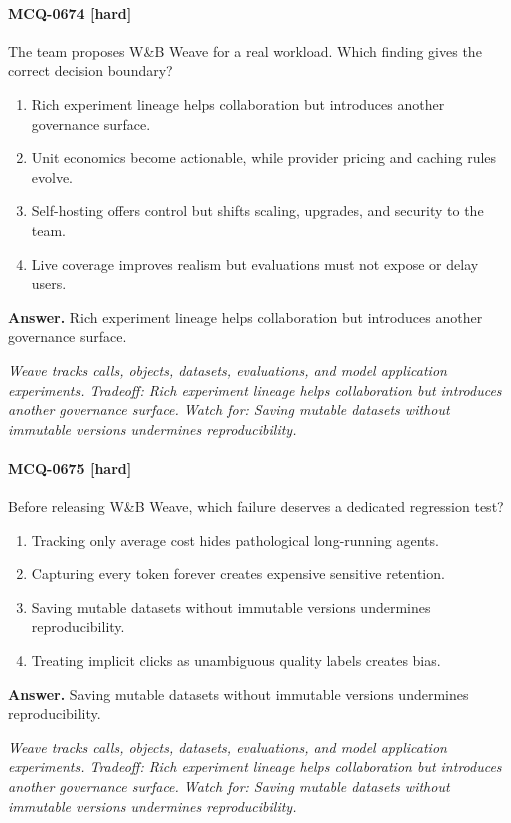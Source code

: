 \paragraph{MCQ-0674 [hard]} The team proposes W\&B Weave for a real workload. Which finding gives the correct decision boundary?
\begin{enumerate}[label=\Alph*.]
\item Rich experiment lineage helps collaboration but introduces another governance surface.
\item Unit economics become actionable, while provider pricing and caching rules evolve.
\item Self-hosting offers control but shifts scaling, upgrades, and security to the team.
\item Live coverage improves realism but evaluations must not expose or delay users.
\end{enumerate}
\noindent\textbf{Answer.} Rich experiment lineage helps collaboration but introduces another governance surface.
\par\textit{Weave tracks calls, objects, datasets, evaluations, and model application experiments. Tradeoff: Rich experiment lineage helps collaboration but introduces another governance surface. Watch for: Saving mutable datasets without immutable versions undermines reproducibility.}
\paragraph{MCQ-0675 [hard]} Before releasing W\&B Weave, which failure deserves a dedicated regression test?
\begin{enumerate}[label=\Alph*.]
\item Tracking only average cost hides pathological long-running agents.
\item Capturing every token forever creates expensive sensitive retention.
\item Saving mutable datasets without immutable versions undermines reproducibility.
\item Treating implicit clicks as unambiguous quality labels creates bias.
\end{enumerate}
\noindent\textbf{Answer.} Saving mutable datasets without immutable versions undermines reproducibility.
\par\textit{Weave tracks calls, objects, datasets, evaluations, and model application experiments. Tradeoff: Rich experiment lineage helps collaboration but introduces another governance surface. Watch for: Saving mutable datasets without immutable versions undermines reproducibility.}
